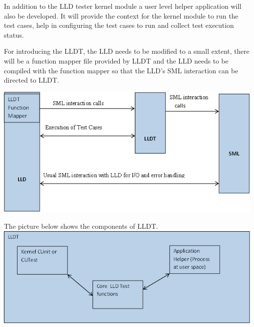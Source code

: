 In addition to the LLD tester kernel module a user level helper application will also be developed. It will provide the context for the kernel module to run the test cases, help in configuring the test cases to run and collect test execution status.  

For introducing the LLDT, the LLD needs to be modified to a small extent, there will be a function mapper file provided by LLDT and the LLD needs to be compiled with the function mapper so that the LLD’s SML interaction can be directed to LLDT. 

\includegraphics[scale=1]
{fig6}

The picture below shows the components of LLDT. \\

\includegraphics[scale=1]
{fig7}